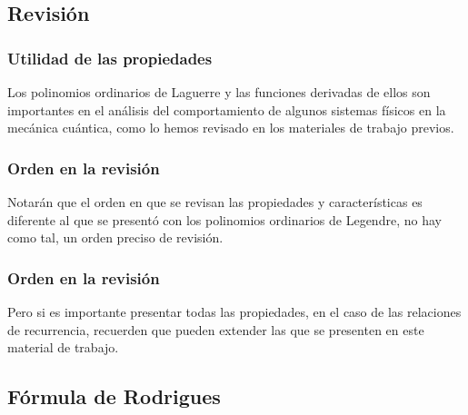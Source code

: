 \documentclass[12pt]{beamer}
\begin{document}
\subsection{Revisión}

\begin{frame}
\frametitle{Utilidad de las propiedades}
Los polinomios ordinarios de Laguerre y las funciones derivadas de ellos son importantes en el análisis del comportamiento de algunos sistemas físicos en la mecánica cuántica, como lo hemos revisado en los materiales de trabajo previos.
\end{frame}
\begin{frame}
\frametitle{Orden en la revisión}
Notarán que el orden en que se revisan las propiedades y características es diferente al que se presentó con los polinomios ordinarios de Legendre, no hay como tal, un orden preciso de revisión.
\end{frame}
\begin{frame}
\frametitle{Orden en la revisión}
Pero si es importante presentar todas las propiedades, en el caso de las relaciones de recurrencia, recuerden que pueden extender las que se presenten en este material de trabajo.
\end{frame}

\subsection{Fórmula de Rodrigues}
\end{document}
